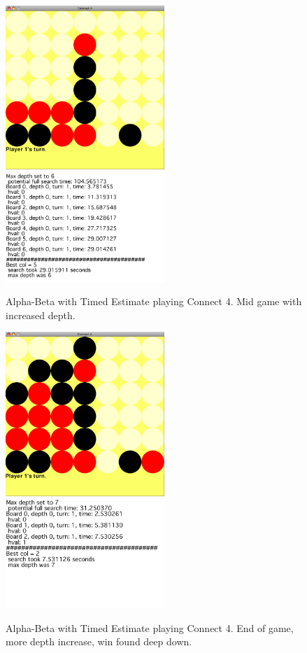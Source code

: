\documentclass[12pt]{article}
\begin{document}
\begin{figure}[h!]
        \begin{center}
		\includegraphics[width=60mm]{report_images/abt_play_mid.png}
		\includegraphics[width=60mm]{report_images/abt_play_mid_text.png}
                	\caption{Alpha-Beta with Timed Estimate playing Connect 4. Mid game with increased depth.}
                	\label{abt_play_mid}
        \end{center}
\end{figure}

\begin{figure}[h!]
        \begin{center}
		\includegraphics[width=60mm]{report_images/abt_play_det_win.png}
		\includegraphics[width=60mm]{report_images/abt_play_det_win_text.png}
                	\caption{Alpha-Beta with Timed Estimate playing Connect 4. End of game, more depth increase, win found deep down.}
                	\label{abt_play_det_win}
        \end{center}
\end{figure}
\end{document}
